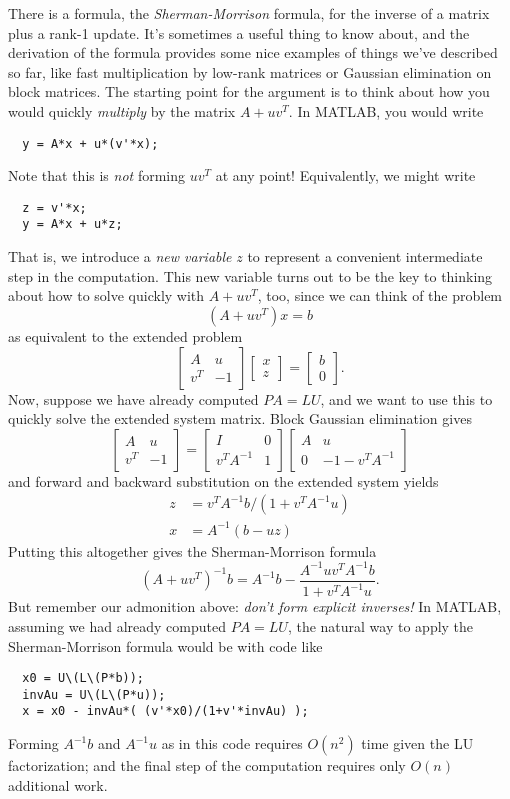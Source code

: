 \documentclass[12pt, leqno]{article}
\begin{document}
There is a formula, the {\em Sherman-Morrison} formula, for the
inverse of a matrix plus a rank-1 update.  It's sometimes a useful
thing to know about, and the derivation of the formula provides some
nice examples of things we've described so far, like fast multiplication
by low-rank matrices or Gaussian elimination on block matrices.
The starting point for the argument is to think about how you would
quickly {\em multiply} by the matrix $A+uv^T$.  In MATLAB, you would
write
\begin{lstlisting}
  y = A*x + u*(v'*x);
\end{lstlisting}
Note that this is {\em not} forming $uv^T$ at any point!
Equivalently, we might write
\begin{lstlisting}
  z = v'*x;
  y = A*x + u*z;
\end{lstlisting}
That is, we introduce a {\em new variable} $z$ to represent
a convenient intermediate step in the computation.  This
new variable turns out to be the key to thinking about how
to solve quickly with $A+uv^T$, too, since we can think of
the problem
\[
  (A+uv^T) x = b
\]
as equivalent to the extended problem
\[
\begin{bmatrix}
  A & u \\
  v^T & -1
\end{bmatrix}
\begin{bmatrix} x \\ z \end{bmatrix} =
\begin{bmatrix} b \\ 0 \end{bmatrix}.
\]
Now, suppose we have already computed $PA = LU$, and we want to use
this to quickly solve the extended system matrix.  Block Gaussian
elimination gives
\[
\begin{bmatrix}
  A & u \\
  v^T & -1
\end{bmatrix} =
\begin{bmatrix}
  I & 0 \\
  v^T A^{-1} & 1
\end{bmatrix}
\begin{bmatrix}
  A & u \\
  0 & -1-v^T A^{-1}
\end{bmatrix}
\]
and forward and backward substitution on the extended system yields
\begin{align*}
  z &= v^T A^{-1} b / (1 + v^T A^{-1} u) \\
  x &= A^{-1} (b - u z)
\end{align*}
Putting this altogether gives the Sherman-Morrison formula
\[
  (A+uv^T)^{-1} b = A^{-1} b - \frac{A^{-1} u v^T A^{-1} b}{1 + v^T A^{-1} u}.
\]
But remember our admonition above: {\em don't form explicit inverses!}
In MATLAB, assuming we had already computed $PA = LU$, the natural way
to apply the Sherman-Morrison formula would be with code like
\begin{lstlisting}
  x0 = U\(L\(P*b));
  invAu = U\(L\(P*u));
  x = x0 - invAu*( (v'*x0)/(1+v'*invAu) );
\end{lstlisting}
Forming $A^{-1} b$ and $A^{-1} u$ as in this code requires $O(n^2)$
time given the LU factorization; and the final step of the computation
requires only $O(n)$ additional work.
\end{document}
